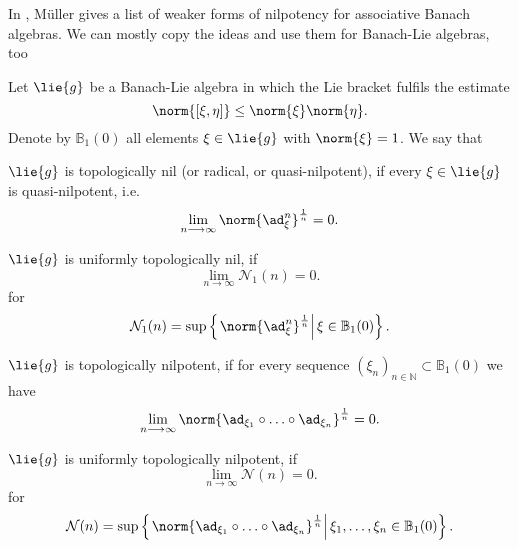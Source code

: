 In \cite{muller:1994a}, M\"uller gives a list of weaker forms of nilpotency for 
associative Banach algebras. We can mostly copy the ideas and use them for 
Banach-Lie algebras, too
\begin{definition}
	Let $\lie{g}$ be a Banach-Lie algebra in which the Lie bracket fulfils the 
	estimate
	\begin{equation*}
		\norm{ [\xi, \eta] }
		\leq
		\norm{\xi}
		\norm{\eta}.
	\end{equation*}
	Denote by $\mathbb{B}_1(0)$ all elements $\xi \in \lie{g}$ with 
	$\norm{\xi} = 1$. We say that
	\begin{definitionlist}
		\item
		$\lie{g}$ is topologically nil (or radical, or quasi-nilpotent), if
		every $\xi \in \lie{g}$ is quasi-nilpotent, i.e.
		\begin{equation*}
			\lim_{n \longrightarrow \infty}
			\norm{\ad_{\xi}^n}^{\frac{1}{n}}
			=
			0.
		\end{equation*}
		
		\item
		$\lie{g}$ is uniformly topologically nil, if
		\begin{equation*}
			\lim_{n \longrightarrow \infty}
			\mathcal{N}_1(n)
			=
			0.
		\end{equation*}
		for
		\begin{equation}
			\mathcal{N}_1(n)
			=
			\sup \left\{ 
			\left.
				\norm{ \ad_{\xi}^n}^{\frac{1}{n}} 
			\right|
				\xi \in \mathbb{B}_1(0)
			\right\}.
		\end{equation}
		
		\item
		$\lie{g}$ is topologically nilpotent, if for every sequence
		$(\xi_n)_{n \in \mathbb{N}} \subset \mathbb{B}_1(0)$ we have
		\begin{equation*}
			\lim_{n \longrightarrow \infty}
			\norm{ 
				\ad_{\xi_1} \circ \ldots \circ \ad_{\xi_n}
			}^{\frac{1}{n}}
			=
			0.
		\end{equation*}
		
		\item
		$\lie{g}$ is uniformly topologically nilpotent, if
		\begin{equation*}
			\lim_{n \longrightarrow \infty}
			\mathcal{N}(n)
			=
			0.
		\end{equation*}
		for
		\begin{equation}
			\mathcal{N}(n)
			=
			\sup \left\{ 
			\left.
				\norm{ 
					\ad_{\xi_1} \circ \ldots \circ \ad_{\xi_n}
				}^{\frac{1}{n}} 
			\right|
				\xi_1, \ldots, \xi_n \in \mathbb{B}_1(0)
			\right\}.
		\end{equation}
	\end{definitionlist}
\end{definition}
